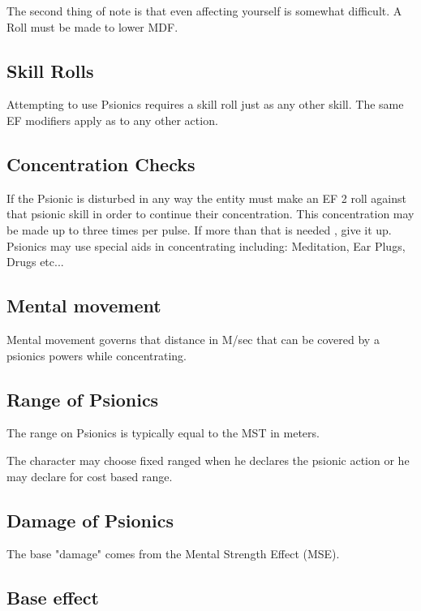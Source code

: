 The second thing of note is that even affecting yourself is somewhat
difficult. A Roll must be made to lower MDF.

\subsection{Skill Rolls}

Attempting to use Psionics requires a skill roll just as any other skill.
The same EF modifiers apply as to any other action. 

\subsection{Concentration Checks}

If the Psionic is disturbed in any way the entity must make an EF 2 roll
against that psionic skill in order to continue their concentration. This
concentration may be made up to three times per pulse. If more than that is
needed , give it up. Psionics may use special aids in concentrating including: 
Meditation, Ear Plugs, Drugs etc...

\subsection{Mental movement}

Mental movement governs that distance in M/sec that can be covered by 
a psionics powers while concentrating.

\subsection{Range of Psionics}

The range on Psionics is typically equal to the MST in meters.

The character may choose fixed ranged when he declares the psionic 
action or he may declare for cost based range. 

\subsection{Damage of Psionics}

The base "damage" comes from the Mental Strength Effect (MSE).

\subsection{Base effect}

